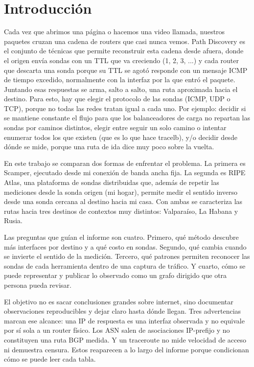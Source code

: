 \section{Introducción}\label{sec:intro}


Cada vez que abrimos una página o hacemos una video llamada, nuestros paquetes cruzan una cadena de routers que casi nunca vemos. Path Discovery es el conjunto de técnicas que permite reconstruir esta cadena desde afuera, donde el origen envía sondas con un TTL que va creciendo (1, 2, 3, ...) y cada router que descarta una sonda porque su TTL se agotó responde con un mensaje ICMP de tiempo excedido, normalmente con la interfaz por la que entró el paquete. Juntando esas respuestas se arma, salto a salto, una ruta aproximada hacia el destino. 
Para esto, hay que elegir el protocolo de las sondas (ICMP, UDP o TCP), porque no todas las redes tratan igual a cada uno. Por ejemplo: decidir si se mantiene constante el flujo para que los balanceadores de carga no repartan las sondas por caminos distintos, elegir entre seguir un solo camino o intentar enumerar todos los que existen (que es lo que hace tracelb), y/o decidir desde dónde se mide, porque una ruta de ida dice muy poco sobre la vuelta.

En este trabajo se comparan dos formas de enfrentar el problema. La primera es Scamper, ejecutado desde mi conexión de banda ancha fija. La segunda es RIPE Atlas, una plataforma de sondas distribuidas que, además de repetir las mediciones desde la sonda origen (mi hogar), permite medir el sentido inverso desde una sonda cercana al destino hacia mi casa. Con ambas se caracteriza las rutas hacia tres destinos de contextos muy distintos: Valparaíso, La Habana y Rusia.

Las preguntas que guían el informe son cuatro. Primero, qué método descubre más interfaces por destino y a qué costo en sondas. Segundo, qué cambia cuando se invierte el sentido de la medición. Tercero, qué patrones permiten reconocer las sondas de cada herramienta dentro de una captura de tráfico. Y cuarto, cómo se puede representar y publicar lo observado como un grafo dirigido que otra persona pueda revisar.

El objetivo no es sacar conclusiones grandes sobre internet, sino documentar observaciones reproducibles y dejar claro hasta dónde llegan. Tres advertencias marcan ese alcance: una IP de respuesta es una interfaz observada y no equivale por sí sola a un router físico. Los ASN salen de asociaciones IP-prefijo y no constituyen una ruta BGP medida. Y un traceroute no mide velocidad de acceso ni demuestra censura. Estos reaparecen a lo largo del informe porque condicionan cómo se puede leer cada tabla.





